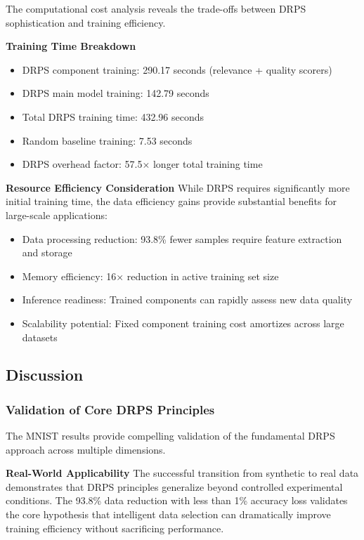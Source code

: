 \documentclass[12pt]{article}
\begin{document}
The computational cost analysis reveals the trade-offs between DRPS sophistication and training efficiency.

\textbf{Training Time Breakdown}
\begin{itemize}
\item DRPS component training: 290.17 seconds (relevance + quality scorers)
\item DRPS main model training: 142.79 seconds
\item Total DRPS training time: 432.96 seconds
\item Random baseline training: 7.53 seconds
\item DRPS overhead factor: 57.5× longer total training time
\end{itemize}

\textbf{Resource Efficiency Consideration}
While DRPS requires significantly more initial training time, the data efficiency gains provide substantial benefits for large-scale applications:

\begin{itemize}
\item Data processing reduction: 93.8\% fewer samples require feature extraction and storage
\item Memory efficiency: 16× reduction in active training set size
\item Inference readiness: Trained components can rapidly assess new data quality
\item Scalability potential: Fixed component training cost amortizes across large datasets
\end{itemize}

\subsection{Discussion}\label{discussion}

\subsubsection{Validation of Core DRPS Principles}\label{validation-principles}

The MNIST results provide compelling validation of the fundamental DRPS approach across multiple dimensions.

\textbf{Real-World Applicability}
The successful transition from synthetic to real data demonstrates that DRPS principles generalize beyond controlled experimental conditions. The 93.8\% data reduction with less than 1\% accuracy loss validates the core hypothesis that intelligent data selection can dramatically improve training efficiency without sacrificing performance.
\end{document}
